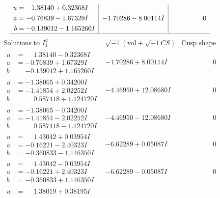 \documentclass[1p]{elsarticle_modified}
\theoremstyle{definition}
\newcommand{\I}{\sqrt{-1}}
\begin{document}
$$\begin{array}{c|c|c}
\begin{aligned}
u &= \phantom{-}1.38140 + 0.32368 I \\
a &= -0.76839 - 1.67329 I \\
b &= -0.139012 - 1.165260 I\end{aligned}
 & -1.70286 - 8.00114 I & \phantom{-0.000000 } 0\\
 \hline 
 \end{array}$$\newpage$$\begin{array}{c|c|c}  
\text{Solutions to }I^u_{1}& \I (\text{vol} + \sqrt{-1}CS) & \text{Cusp shape}\\
 \hline 
\begin{aligned}
u &= \phantom{-}1.38140 - 0.32368 I \\
a &= -0.76839 + 1.67329 I \\
b &= -0.139012 + 1.165260 I\end{aligned}
 & -1.70286 + 8.00114 I & \phantom{-0.000000 } 0 \\ \hline\begin{aligned}
u &= -1.38065 + 0.34200 I \\
a &= -1.41854 + 2.02252 I \\
b &= \phantom{-}0.587418 + 1.124720 I\end{aligned}
 & -4.46950 + 12.08680 I & \phantom{-0.000000 } 0 \\ \hline\begin{aligned}
u &= -1.38065 - 0.34200 I \\
a &= -1.41854 - 2.02252 I \\
b &= \phantom{-}0.587418 - 1.124720 I\end{aligned}
 & -4.46950 - 12.08680 I & \phantom{-0.000000 } 0 \\ \hline\begin{aligned}
u &= \phantom{-}1.43042 + 0.03954 I \\
a &= -0.16221 - 2.40323 I \\
b &= -0.360833 - 1.146350 I\end{aligned}
 & -6.62289 + 0.05087 I & \phantom{-0.000000 } 0 \\ \hline\begin{aligned}
u &= \phantom{-}1.43042 - 0.03954 I \\
a &= -0.16221 + 2.40323 I \\
b &= -0.360833 + 1.146350 I\end{aligned}
 & -6.62289 - 0.05087 I & \phantom{-0.000000 } 0 \\ \hline\begin{aligned}
u &= \phantom{-}1.38019 + 0.38195 I \\

\end{aligned}
\end{array}$$
\end{document}
